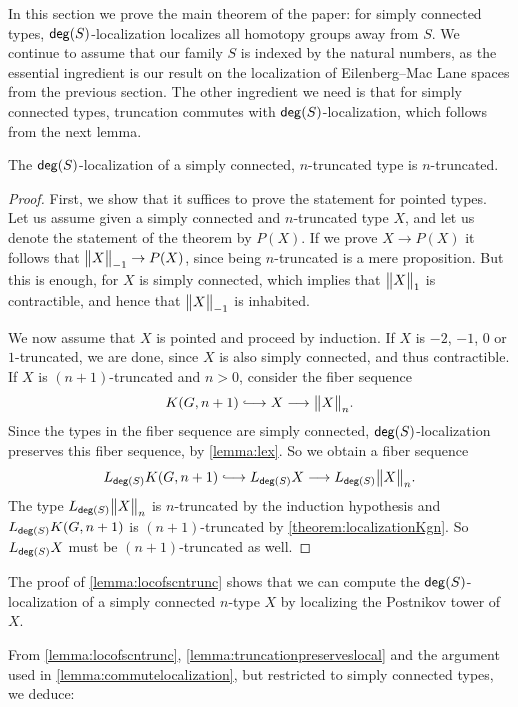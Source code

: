 In this section we prove the main theorem of the paper:
for simply connected types, $\degg(S)$-localization localizes all homotopy groups away from $S$.
We continue to assume that our family $S$ is indexed by the natural numbers,
as the essential ingredient is our result on the localization of Eilenberg--Mac Lane spaces from the previous section.
The other ingredient we need is that for simply connected types,
truncation commutes with $\degg(S)$-localization, which follows
from the next lemma.

\begin{lem}\label{lemma:locofscntrunc}
    The $\degg(S)$-localization of a simply connected, $n$-truncated type is $n$-truncated.
\end{lem}

\begin{proof}
    First, we show that it suffices to prove the statement for pointed types.
    Let us assume given a simply connected and $n$-truncated type $X$, and let us denote the statement
    of the theorem by $P(X)$. If we prove $X \to P(X)$ it follows that $\ttrunc{-1}{X} \to P(X)$,
    since being $n$-truncated is a mere proposition. But this is enough, for $X$ is
    simply connected, which implies that $\ttrunc{1}{X}$ is contractible, and hence that
    $\ttrunc{-1}{X}$ is inhabited.

    We now assume that $X$ is pointed and proceed by induction.
    If $X$ is $-2$, $-1$, $0$ or $1$-truncated, we are done, since $X$ is also simply connected, and thus contractible.
    If $X$ is $(n+1)$-truncated and $n > 0$, consider the fiber sequence
    \[ K(G,n+1) \longhookrightarrow X \lra \ttrunc{n}{X}. \]
    Since the types in the fiber sequence are simply connected, $\degg(S)$-localization
    preserves this fiber sequence, by \cref{lemma:lex}. So we obtain a fiber sequence
    \[L_{\degg(S)} K(G,n+1) \longhookrightarrow L_{\degg(S)}X \lra L_{\degg(S)} \ttrunc{n}{X}. \]
    The type $L_{\degg(S)} \ttrunc{n}{X}$ is $n$-truncated by the induction hypothesis
    and $L_{\degg(S)} K(G,n+1)$ is $(n+1)$-truncated by \cref{theorem:localizationKgn}.
    So $L_{\degg(S)} X$ must be $(n+1)$-truncated as well.
\end{proof}

The proof of \cref{lemma:locofscntrunc} shows that we can compute
the $\degg(S)$-localization of a simply connected $n$-type $X$ by
localizing the Postnikov tower of $X$.

From \cref{lemma:locofscntrunc}, \cref{lemma:truncationpreserveslocal} and
the argument used in \cref{lemma:commutelocalization}, but restricted to simply connected types,
we deduce:

